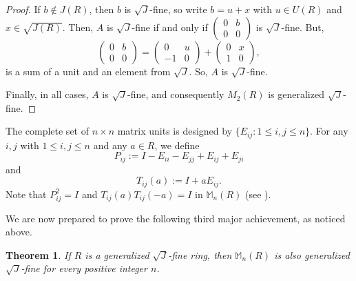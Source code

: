 \documentclass[12pt]{amsart}
\newtheorem{theorem}{Theorem}[section]
\theoremstyle{definition}
\begin{document}
\begin{proof}
If \( b \not\in J(R) \), then \( b \) is $\sqrt{J}$-fine, so write \( b = u + x \) with \( u \in U(R) \) and \( x \in \sqrt{J(R)} \). Then, \( A \) is $\sqrt{J}$-fine if and only if \( \begin{pmatrix} 0 & b \\ 0 & 0 \end{pmatrix} \) is $\sqrt{J}$-fine. But,
	\[
	\begin{pmatrix} 0 & b \\ 0 & 0 \end{pmatrix}
	= \begin{pmatrix} 0 & u \\ -1 & 0 \end{pmatrix} + \begin{pmatrix} 0 & x \\ 1 & 0 \end{pmatrix},
	\]
is a sum of a unit and an element from $\sqrt{J}$. So, \( A \) is $\sqrt{J}$-fine.
	
Finally, in all cases, \( A \) is $\sqrt{J}$-fine, and consequently \( M_2(R) \) is generalized $\sqrt{J}$-fine.
\end{proof}

The complete set of \( n \times n \) matrix units is designed by \(\{E_{ij} : 1 \leq i, j \leq n\}\). For any \(i, j\) with \(1 \leq i, j \leq n\) and any \(a \in R\), we define
\[
P_{ij} := I - E_{ii} - E_{jj} + E_{ij} + E_{ji}
\]
and
\[
T_{ij}(a) := I + aE_{ij}.
\]
Note that \(P_{ij}^2 = I\) and \(T_{ij}(a)T_{ij}(-a) = I\) in \(\mathbb{M}_n(R)\) (see \cite{z}).

\medskip

We are now prepared to prove the following third major achievement, as noticed above.

\begin{theorem}\label{22}
If \(R\) is a generalized \(\sqrt{J}\)-fine ring, then \(\mathbb{M}_n(R)\) is also generalized \(\sqrt{J}\)-fine for every positive integer \(n\).
\end{theorem}
\end{document}
